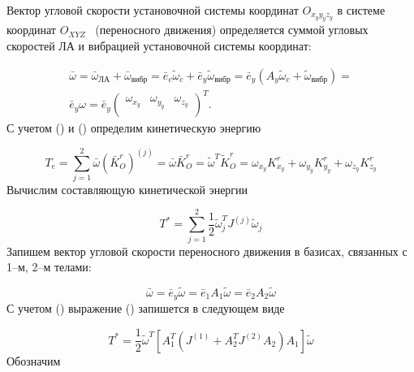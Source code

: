 Вектор угловой скорости установочной системы координат \( O_{x_{y}y_{y}z_{y}} \) в системе координат \( O_{XYZ} \) \ (переносного движения) определяется суммой угловых скоростей ЛА и вибрацией установочной системы координат: 






\begin{equation} %
\label{eq:p3:16}
\begin{multlined}
\bar{\omega} = 
\bar{\omega}_{\textit{ЛА}}+ \bar{\omega}_{\textit{вибр}}=
\bar{e}_{c} \tilde{\omega}_{c}+\bar{e}_{\textit{y}} \tilde{\omega}_{\textit{вибр}}=
\bar{e}_{y} \left( A_{y} \tilde{\omega}_{c}+ \tilde{\omega}_{\textit{вибр}} \right) = \\
\bar{e}_{y} \omega =\bar{e}_{y} \left( \begin{matrix}
\omega_{x_{y}} & \omega_{y_{y}} & \omega_{z_{y}}\\
\end{matrix}
\right) ^{T}.
\end{multlined}
\end{equation}
С учетом () и () определим кинетическую энергию 


\begin{equation} %
\label{eq:p3:17}
T_{e}= 
\sum_{j=1}^{2} \bar{\omega} \left( \bar{K}_{O}^{r} \right)^{ \left( j \right) }= 
\bar{\omega} \bar{K}_{O}^{r}= 
\tilde{\omega}^{T}\tilde{K}_{O}^{r}= 
\omega_{x_{y}}K_{x_{y}}^{r}+ \omega_{y_{y}}K_{y_{y}}^{r}+ \omega_{z_{y}}K_{z_{y}}^{r}
\end{equation}
Вычислим составляющую кинетической энергии 


\begin{equation} %
\label{eq:p3:18}
T^{\ast}= \sum_{j=1}^{2}\frac{1}{2} \tilde{\omega}_{j}^{T}J^{ \left( j \right) } \tilde{\omega}_{j}
\end{equation}
Запишем вектор угловой скорости переносного движения в базисах, связанных с 1–м, 2–м телами: 


\begin{equation} %
\label{eq:p3:19}
\bar{\omega} =\bar{e}_{y} \tilde{\omega} =\bar{e}_{1}A_{1} \tilde{\omega} =\bar{e}_{2}A_{2} \tilde{\omega} 
\end{equation}
С учетом () выражение () запишется в следующем виде 


\begin{equation} %
\label{eq:p3:20}
T^{\ast}=
\frac{1}{2} \tilde{\omega} ^{T} [ A_{1}^{T} ( J^{ ( 1 ) }+A_{2}^{T}J^{ ( 2 ) }A_{2} ) A_{1} ] \tilde{\omega}
\end{equation}
Обозначим 


